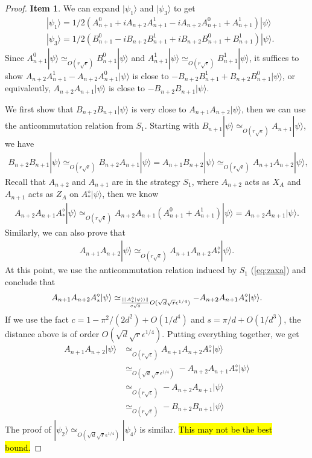 \documentclass[11pt,letterpaper]{article}
\newcommand{\ket}[1]{|#1\rangle}
\DeclarePairedDelimiter{\norm}{\lVert}{\rVert}
\newcommand{\1}{\mathbb{1}}
\newcommand{\se}{\sqrt{\epsilon}}
\newcommand{\qe}{\epsilon^{1/4}}
\newcommand{\sd}{\sqrt{d}}
\newcommand{\sr}{\sqrt{r}}
\newcommand{\appd}[1]{\simeq_{#1}}
\theoremstyle{definition}
\begin{document}
\begin{proof}
	\textbf{Item 1}. We can expand $\ket{\psi_1}$ and $\ket{\psi_3}$ to get
	\begin{align}
		&\ket{\psi_1} = 1/2(A_{n+1}^0 + iA_{n+2}A_{n+1}^1 - iA_{n+2}A_{n+1}^0 +A_{n+1}^1) \ket{\psi} \\
		&\ket{\psi_3} = 1/2(B_{n+1}^0 - iB_{n+2}B_{n+1}^1+iB_{n+2}B_{n+1}^0 + B_{n+1}^1)\ket{\psi}.
	\end{align}
	Since $A_{n+1}^0 \ket{\psi} \appd{O(r\se)} B_{n+1}^0 \ket{\psi}$ and $A_{n+1}^1 \ket{\psi} \appd{O(r\se)} B_{n+1}^1 \ket{\psi}$,
	it suffices to show
	$A_{n+2}A_{n+1}^1 - A_{n+2}A_{n+1}^0 \ket{\psi}$ is close to $- B_{n+2}B_{n+1}^1+B_{n+2}B_{n+1}^0\ket{\psi}$,
	or equivalently,
	$A_{n+2}A_{n+1} \ket{\psi}$ is close to $-B_{n+2}B_{n+1} \ket{\psi}$.

	
	We first show that $B_{n+2}B_{n+1} \ket{\psi}$ is very close to $A_{n+1}A_{n+2}\ket{\psi}$, then we 
	can use the anticommutation relation from $S_1$.
	Starting with $B_{n+1} \ket{\psi} \appd{O(r\se)} A_{n+1}\ket{\psi}$, we have
	\begin{align}
		B_{n+2}B_{n+1}\ket{\psi} \appd{O(r\se)} B_{n+2}A_{n+1}\ket{\psi} =A_{n+1} B_{n+2}\ket{\psi} \appd{O(r\se)} A_{n+1}A_{n+2}\ket{\psi},
	\end{align}
	Recall that $A_{n+2}$ and $A_{n+1}$ are in the strategy $S_1$, where $A_{n+2}$ acts as $X_A$ 
	and $A_{n+1}$ acts as $Z_A$ on $A_\ast^\diamond \ket{\psi}$, then we know 
	\begin{align}
		A_{n+2}A_{n+1} A_\ast^\diamond \ket{\psi} \appd{O(r\se)} A_{n+2}A_{n+1}(A_{n+1}^0 + A_{n+1}^1)\ket{\psi} = A_{n+2}A_{n+1}\ket{\psi}.
	\end{align}
	Similarly, we can also prove that 
	\begin{align}
		A_{n+1}A_{n+2} \ket{\psi} \appd{O( r\se)} A_{n+1}A_{n+2} A_\ast^\diamond \ket{\psi}.
	\end{align}
	At this point, we use the anticommutation relation induced by $S_1$ (\cref{eq:zaxa}) and conclude that 
	\begin{align}
		A_{n+1}A_{n+2} A_\ast^\diamond \ket{\psi} \appd{\frac{\norm{\ket{A_\ast^\diamond\ket{\psi}}}}{c\sqrt{s}}O(\sd\sr\qe)} -A_{n+2}A_{n+1} A_\ast^\diamond \ket{\psi}.
	\end{align}
	If we use the fact $c = 1 - \pi^2/(2d^2) + O(1/d^4)$ and $s = \pi/d + O(1/d^3)$, the distance above is of order $O(\sd \sr \qe)$.
	Putting everything together, we get 
	\begin{align}
		A_{n+1}A_{n+2} \ket{\psi} &\appd{O( r\se)} A_{n+1}A_{n+2} A_\ast^\diamond \ket{\psi}\\
							&\appd{O(\sd \sr \qe)} -A_{n+2}A_{n+1} A_\ast^\diamond \ket{\psi}\\
							&\appd{O( r\se)} -A_{n+2}A_{n+1} \ket{\psi} \\
							&\appd{O(r \se)}-B_{n+2}B_{n+1}\ket{\psi}
	\end{align}
	The proof of $\ket{\psi_2} \appd{O(\sd \sr \qe)} \ket{\psi_4}$ is similar.
	\hl{This may not be the best bound.}
	

\end{proof}
\end{document}
